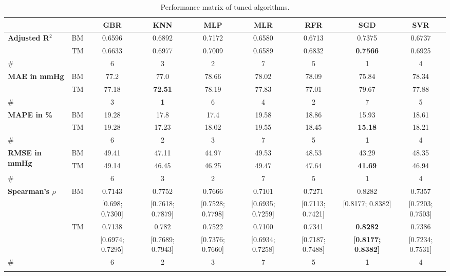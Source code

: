 \documentclass[referee,lineno,pdflatex,sn-nature]{sn-jnl}%
\theoremstyle{thmstyleone}%
\theoremstyle{thmstyletwo}%
\theoremstyle{thmstylethree}%
\begin{document}
\begin{table}
\caption{Performance matrix of tuned algorithms.}\label{tab1}
\footnotesize{
\begin{tabular*}{\textheight}{@{\extracolsep\fill}llccccccc}
\toprule%
    & & GBR & KNN & MLP & MLR & RFR & SGD & SVR \\
\midrule
    \multirow{2}{*}{\textbf{Adjusted R$^2$}} 
    & BM & 0.6596 & 0.6892 & 0.7172 & 0.6580 & 0.6713 & 0.7375 & 0.6737 \\
    & TM & 0.6633 & 0.6977 & 0.7009 & 0.6589 & 0.6832 & \textbf{0.7566} & 0.6925 \\
    \# & & 6 & 3 & 2 & 7 & 5 & \textbf{1} & 4 \\
\midrule
    \multirow{2}{*}{\textbf{MAE in mmHg}} 
    & BM & 77.2 & 77.0 & 78.66 & 78.02 & 78.09 & 75.84 & 78.34 \\
    & TM & 77.18 & \textbf{72.51} & 78.19 & 77.83 & 77.01 & 79.67 & 77.88 \\
    \# & & 3 & \textbf{1} & 6 & 4 & 2 & 7 & 5 \\
\midrule
    \multirow{2}{*}{\textbf{MAPE in \%}} 
    & BM & 19.28 & 17.8 & 17.4 & 19.58 & 18.86 & 15.93 & 18.61 \\
    & TM & 19.28 & 17.23 & 18.02 & 19.55 & 18.45 & \textbf{15.18} & 18.21 \\
    \# & & 6 & 2 & 3 & 7 & 5 & \textbf{1} & 4 \\
\midrule
    \multirow{2}{*}{\textbf{RMSE in mmHg}} 
    & BM & 49.41 & 47.11 & 44.97 & 49.53 & 48.53 & 43.29 & 48.35 \\
    & TM & 49.14 & 46.45 & 46.25 & 49.47 & 47.64 & \textbf{41.69} & 46.94 \\
    \#  & & 6 & 3 & 2 & 7 & 5 & \textbf{1} & 4 \\
\midrule
    \multirow{4}{*}{\textbf{Spearman’s $\rho$}} 
    & \multirow{2}{*}{BM} & 0.7143  & 0.7752 & 0.7666 & 0.7101 & 0.7271 & 0.8282 & 0.7357 \\
    & & [0.698; 0.7300] & [0.7618; 0.7879] & [0.7528; 0.7798] & [0.6935; 0.7259] & [0.7113; 0.7421] & [0.8177; 0.8382] & [0.7203; 0.7503] \\
    & \multirow{2}{*}{TM} & 0.7138 & 0.782 & 0.7522 & 0.7100 & 0.7341 & \textbf{0.8282} & 0.7386  \\
    & & [0.6974; 0.7295] & [0.7689; 0.7943] & [0.7376; 0.7660] & [0.6934; 0.7258] & [0.7187; 0.7488] & \textbf{[0.8177; 0.8382]} & [0.7234; 0.7531] \\
    \#  & & 6 & 2 & 3 & 7 & 5 & \textbf{1} & 4 \\
\botrule
\end{tabular*}
}
\end{table}
\end{document}
